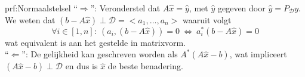\begin{prf}[Normaalstelsel]{prf:Normaalstelsel}
    ``$\Rightarrow$'': Veronderstel dat $A\hat{x} = \hat{y}$, met $\hat{y}$ gegeven door $\hat{y} = P_{\mathcal{D}}y$. We weten dat $(b-A\hat{x}) \perp \mathcal{D} = <a_1,\ldots,a_n>$ waaruit volgt
    \begin{equation*}
        \forall i \in [1,n]: \ ( a_i, (b-A\hat{x}) ) = 0 \ \Leftrightarrow \ a_i^*(b-A\hat{x}) = 0 
    \end{equation*}
    wat equivalent is aan het gestelde in matrixvorm. \\

    ``$\Leftarrow$'': De gelijkheid kan geschreven worden als $A^*(A\hat{x}-b)$, wat impliceert $(A\hat{x}-b) \perp \mathcal{D}$ en dus is $\hat{x}$ de beste benadering.
\end{prf}